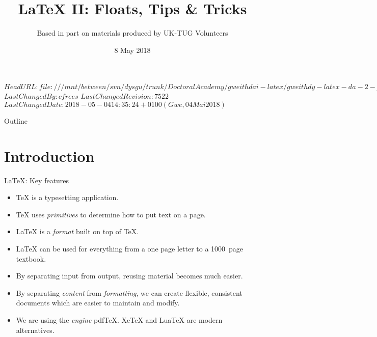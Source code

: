 \svnidlong
{$HeadURL: file:///mnt/between/svn/dysgu/trunk/DoctoralAcademy/gweithdai-latex/gweithdy-latex-da-2-pellach/training.tex $}
{$LastChangedBy: cfrees $}
{$LastChangedRevision: 7522 $}
{$LastChangedDate: 2018-05-04 14:35:24 +0100 (Gwe, 04 Mai 2018) $}

\usepackage[citestyle=authoryear-comp,bibstyle=authoryear,mergedate=basic,isbn=false,url=true,sortcites=true,backend=biber,mincrossrefs=6]{biblatex}




{
  \usetikzlibrary{quotes,automata,positioning,bending,shadows,shapes.arrows}
  \usepackage{tikz-cd}
}


\title{\LaTeX{} II: Floats, Tips \& Tricks}
\subtitle{Based in part on materials produced by UK-TUG Volunteers}
\date{ 8 May 2018}




\begin{frame}
  \titlepage
\end{frame}

\maketitle


\tableofcontents

%
{
  \begin{frame}{Outline}
	\tableofcontents
  \end{frame}
}

%

\section{Introduction}

\begin{frame}{\LaTeX{}: Key features}

  \begin{itemize}
	\item \TeX{} is a typesetting application.
	\item \TeX{} uses \emph{primitives} to determine how to put text on a page.
	\item \LaTeX{} is  a \emph{format} built on top of \TeX{}.
	\item \LaTeX{} can be used for everything from a one page letter to a 1000~page textbook.
	\item By separating input from output, reusing material becomes much easier.
	\item By separating \emph{content} from \emph{formatting}, we can create flexible, consistent documents which are easier to maintain and modify.
	\item We are using the \emph{engine} pdf\TeX{}.
	Xe\TeX{} and Lua\TeX{} are modern alternatives.
  \end{itemize}

\end{frame}

